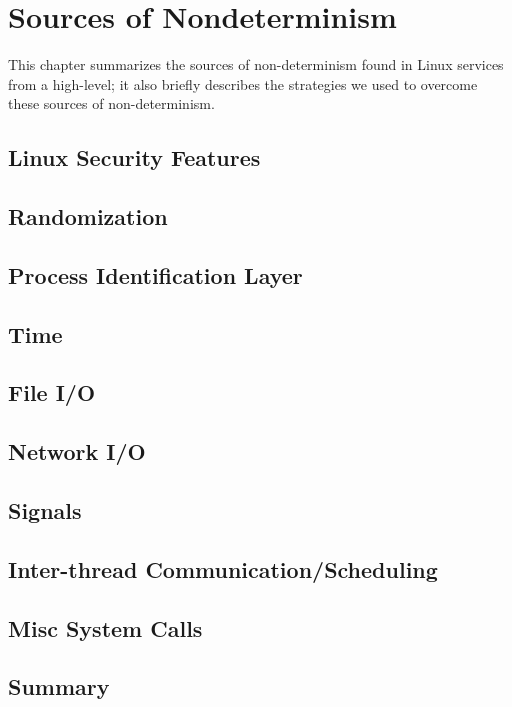 \chapter{Sources of Nondeterminism}
This chapter summarizes the sources of non-determinism
found in Linux services from a high-level; it also
briefly describes the strategies we used to
overcome these sources of non-determinism. 

\section{Linux Security Features}

\section{Randomization}

\section{Process Identification Layer}

\section{Time}

\section{File I/O}

\section{Network I/O}

\section{Signals}

\section{Inter-thread Communication/Scheduling} 

\section{Misc System Calls}

\section {Summary}
